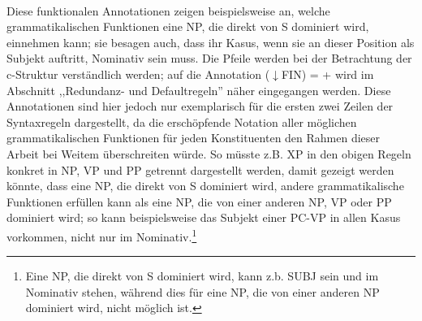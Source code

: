 \documentclass[12pt,a4paper]{article}
\begin{document}
\begin{singlespace}
\begin{tabular}{ l  l  c  c  c  c  c  c  c}
\end{tabular}\\
\newline
\end{singlespace}

Diese funktionalen Annotationen zeigen beispielsweise an, welche grammatikalischen Funktionen eine NP, die direkt von S dominiert wird, einnehmen kann; sie besagen auch, dass ihr Kasus, wenn sie an dieser Position als Subjekt auftritt, Nominativ sein muss. Die Pfeile werden bei der Betrachtung der c-Struktur verständlich werden; auf die Annotation ($\downarrow$FIN) = + wird im Abschnitt ,,Redundanz- und Defaultregeln'' näher eingegangen werden. Diese Annotationen sind hier jedoch nur exemplarisch für die ersten zwei Zeilen der Syntaxregeln dargestellt, da die erschöpfende Notation aller möglichen grammatikalischen Funktionen für jeden Konstituenten den Rahmen dieser Arbeit bei Weitem überschreiten würde. So müsste z.B. XP in den obigen Regeln konkret in NP, VP und PP getrennt dargestellt werden, damit gezeigt werden könnte, dass eine NP, die direkt von S dominiert wird, andere grammatikalische Funktionen erfüllen kann als eine NP, die von einer anderen NP, VP oder PP dominiert wird; so kann beispielsweise das Subjekt einer PC-VP in allen Kasus vorkommen, nicht nur im Nominativ.\footnote{Eine NP, die direkt von S dominiert wird, kann z.b. SUBJ sein und im Nominativ stehen, während dies für eine NP, die von einer anderen NP dominiert wird, nicht möglich ist.}
\end{document}
